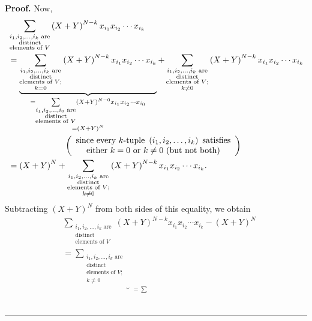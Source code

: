 \documentclass[numbers=enddot,12pt,final,onecolumn,notitlepage]{scrartcl}%
\theoremstyle{definition}
\newenvironment{proof}[1][Proof]{\noindent\textbf{#1.} }{\ \rule{0.5em}{0.5em}}
\let\sumnonlimits\sum
\renewcommand{\sum}{\sumnonlimits\limits}
\newenvironment{verlong}{}{}
\begin{document}
\begin{verlong}
\begin{proof}
Now,%
\begin{align*}
&  \sum_{\substack{i_{1},i_{2},\ldots,i_{k}\text{ are}\\\text{distinct}%
\\\text{elements of }V}}\left(  X+Y\right)  ^{N-k}x_{i_{1}}x_{i_{2}}\cdots
x_{i_{k}}\\
&  =\underbrace{\sum_{\substack{i_{1},i_{2},\ldots,i_{k}\text{ are}%
\\\text{distinct}\\\text{elements of }V;\\k=0}}\left(  X+Y\right)
^{N-k}x_{i_{1}}x_{i_{2}}\cdots x_{i_{k}}}_{\substack{=\sum_{\substack{i_{1}%
,i_{2},\ldots,i_{0}\text{ are}\\\text{distinct}\\\text{elements of }V}}\left(
X+Y\right)  ^{N-0}x_{i_{1}}x_{i_{2}}\cdots x_{i_{0}}\\=\left(  X+Y\right)
^{N}}}+\sum_{\substack{i_{1},i_{2},\ldots,i_{k}\text{ are}\\\text{distinct}%
\\\text{elements of }V;\\k\neq0}}\left(  X+Y\right)  ^{N-k}x_{i_{1}}x_{i_{2}%
}\cdots x_{i_{k}}\\
&  \ \ \ \ \ \ \ \ \ \ \ \ \ \ \ \ \ \ \ \ \left(
\begin{array}
[c]{c}%
\text{since every }k\text{-tuple }\left(  i_{1},i_{2},\ldots,i_{k}\right)
\text{ satisfies}\\
\text{either }k=0\text{ or }k\neq0\text{ (but not both)}%
\end{array}
\right) \\
&  =\left(  X+Y\right)  ^{N}+\sum_{\substack{i_{1},i_{2},\ldots,i_{k}\text{
are}\\\text{distinct}\\\text{elements of }V;\\k\neq0}}\left(  X+Y\right)
^{N-k}x_{i_{1}}x_{i_{2}}\cdots x_{i_{k}}.
\end{align*}
Subtracting $\left(  X+Y\right)  ^{N}$ from both sides of this equality, we
obtain%
\begin{align}
&  \sum_{\substack{i_{1},i_{2},\ldots,i_{k}\text{ are}\\\text{distinct}%
\\\text{elements of }V}}\left(  X+Y\right)  ^{N-k}x_{i_{1}}x_{i_{2}}\cdots
x_{i_{k}}-\left(  X+Y\right)  ^{N}\nonumber\\
&  =\underbrace{\sum_{\substack{i_{1},i_{2},\ldots,i_{k}\text{ are}%
\\\text{distinct}\\\text{elements of }V;\\k\neq0}}}_{\substack{=\sum
}}
\end{align}
\end{proof}
\end{verlong}
\end{document}
